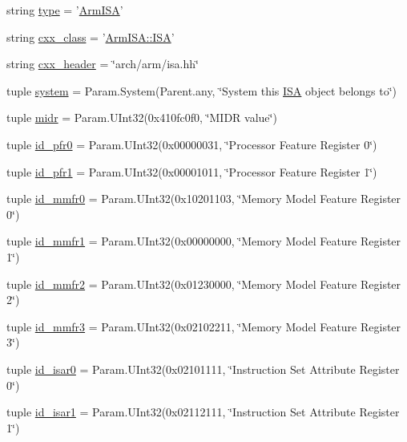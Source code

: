 \begin{DoxyCompactItemize}
\item 
string \hyperlink{classArmISA_1_1ArmISA_acce15679d830831b0bbe8ebc2a60b2ca}{type} = '\hyperlink{classArmISA_1_1ArmISA}{ArmISA}'
\item 
string \hyperlink{classArmISA_1_1ArmISA_a58cd55cd4023648e138237cfc0822ae3}{cxx\_\-class} = '\hyperlink{structArmISA_1_1ISA}{ArmISA::ISA}'
\item 
string \hyperlink{classArmISA_1_1ArmISA_a17da7064bc5c518791f0c891eff05fda}{cxx\_\-header} = \char`\"{}arch/arm/isa.hh\char`\"{}
\item 
tuple \hyperlink{classArmISA_1_1ArmISA_ab737471139f5a296e5b26e8a0e1b0744}{system} = Param.System(Parent.any, \char`\"{}System this \hyperlink{structArmISA_1_1ISA}{ISA} object belongs to\char`\"{})
\item 
tuple \hyperlink{classArmISA_1_1ArmISA_aeca52158cd161ac79fce3c4406d54fbc}{midr} = Param.UInt32(0x410fc0f0, \char`\"{}MIDR value\char`\"{})
\item 
tuple \hyperlink{classArmISA_1_1ArmISA_a248253e22ef8371f8e6f6ae8b2288818}{id\_\-pfr0} = Param.UInt32(0x00000031, \char`\"{}Processor Feature Register 0\char`\"{})
\item 
tuple \hyperlink{classArmISA_1_1ArmISA_a9243b12125ce93324070204d251b3750}{id\_\-pfr1} = Param.UInt32(0x00001011, \char`\"{}Processor Feature Register 1\char`\"{})
\item 
tuple \hyperlink{classArmISA_1_1ArmISA_a259cbe1f754166bd544c3abb11a0c192}{id\_\-mmfr0} = Param.UInt32(0x10201103, \char`\"{}Memory Model Feature Register 0\char`\"{})
\item 
tuple \hyperlink{classArmISA_1_1ArmISA_af523e23e8a95af113d87f846bd3ee2f3}{id\_\-mmfr1} = Param.UInt32(0x00000000, \char`\"{}Memory Model Feature Register 1\char`\"{})
\item 
tuple \hyperlink{classArmISA_1_1ArmISA_a22cf325de7eec913aa7572d0108a5676}{id\_\-mmfr2} = Param.UInt32(0x01230000, \char`\"{}Memory Model Feature Register 2\char`\"{})
\item 
tuple \hyperlink{classArmISA_1_1ArmISA_ac28ffe28e49db9d8b607d2c143f1b61b}{id\_\-mmfr3} = Param.UInt32(0x02102211, \char`\"{}Memory Model Feature Register 3\char`\"{})
\item 
tuple \hyperlink{classArmISA_1_1ArmISA_aa8f6b6f5dfeb7e39605c16828ecf8632}{id\_\-isar0} = Param.UInt32(0x02101111, \char`\"{}Instruction Set Attribute Register 0\char`\"{})
\item 
tuple \hyperlink{classArmISA_1_1ArmISA_abd2f8799402edf75efe951f1cbbe46a7}{id\_\-isar1} = Param.UInt32(0x02112111, \char`\"{}Instruction Set Attribute Register 1\char`\"{})

\end{DoxyCompactItemize}

